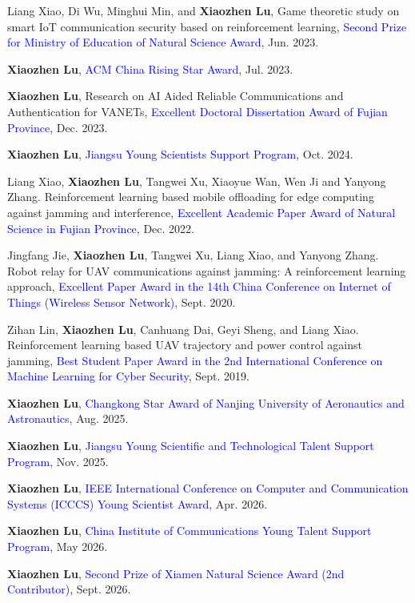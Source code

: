 \documentclass{article}
\begin{document}
\begin{justifying}
	\begin{myreferences}
		\item Liang Xiao, Di Wu, Minghui Min, and \textbf{Xiaozhen Lu}, Game theoretic study on smart IoT communication security based on reinforcement learning, \textcolor{blue}{Second Prize for Ministry of Education of Natural Science Award}, Jun. 2023.
		\item  \textbf{Xiaozhen Lu}, \textcolor{blue}{ACM China Rising Star Award}, Jul. 2023.
		\item \textbf{Xiaozhen Lu}, Research on AI Aided Reliable Communications and Authentication for VANETs, \textcolor{blue}{Excellent Doctoral Dissertation Award of Fujian Province}, Dec. 2023.
		\item \textbf{Xiaozhen Lu}, \textcolor{blue}{Jiangsu Young Scientists Support Program}, Oct. 2024.
		\item  Liang Xiao, \textbf{Xiaozhen Lu}, Tangwei Xu, Xiaoyue Wan, Wen Ji and Yanyong Zhang. Reinforcement learning based mobile offloading for edge computing against jamming and interference, \textcolor{blue}{Excellent Academic Paper Award of Natural Science in Fujian Province}, Dec. 2022.
		\item Jingfang Jie, \textbf{Xiaozhen Lu}, Tangwei Xu, Liang Xiao, and Yanyong Zhang. Robot relay for UAV communications against jamming: A reinforcement learning approach, \textcolor{blue}{Excellent Paper Award in the 14th China Conference on Internet of Things (Wireless Sensor Network)}, Sept. 2020.
		\item Zihan Lin, \textbf{Xiaozhen Lu}, Canhuang Dai, Geyi Sheng, and Liang Xiao. Reinforcement learning based UAV trajectory and power control against jamming, \textcolor{blue}{Best Student Paper Award in the 2nd International Conference on Machine Learning for Cyber Security}, Sept. 2019.
		\item \textbf{Xiaozhen Lu}, \textcolor{blue}{Changkong Star Award of Nanjing University of Aeronautics and Astronautics}, Aug. 2025.
		\item \textbf{Xiaozhen Lu}, \textcolor{blue}{Jiangsu Young Scientific and Technological Talent Support Program}, Nov. 2025.
		\item \textbf{Xiaozhen Lu}, \textcolor{blue}{IEEE International Conference on Computer and Communication Systems (ICCCS) Young Scientist Award}, Apr. 2026.
		\item \textbf{Xiaozhen Lu}, \textcolor{blue}{China Institute of Communications Young Talent Support Program}, May 2026.
		\item \textbf{Xiaozhen Lu}, \textcolor{blue}{Second Prize of Xiamen Natural Science Award (2nd Contributor)}, Sept. 2026.
	\end{myreferences}
\end{justifying}
\end{document}
